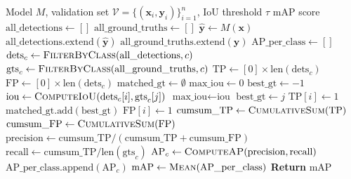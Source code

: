 \begin{algorithm}[H]
\caption{Mean Average Precision Computation}
\label{alg:map_computation}
\begin{algorithmic}[1]
\Require Model $M$, validation set $\mathcal{V} = \{(\mathbf{x}_i, \mathbf{y}_i)\}_{i=1}^{n}$, IoU threshold $\tau$
\Ensure mAP score
\State $\text{all\_detections} \gets []$
\State $\text{all\_ground\_truths} \gets []$
    \State $\hat{\mathbf{y}} \gets M(\mathbf{x})$ 
    \State $\text{all\_detections}.\text{extend}(\hat{\mathbf{y}})$
    \State $\text{all\_ground\_truths}.\text{extend}(\mathbf{y})$
\EndFor
\State $\text{AP\_per\_class} \gets []$
    \State $\text{dets}_c \gets \Call{FilterByClass}{\text{all\_detections}, c}$
    \State $\text{gts}_c \gets \Call{FilterByClass}{\text{all\_ground\_truths}, c}$
    \State {}
    \State $\text{TP} \gets [0] \times \text{len}(\text{dets}_c)$
    \State $\text{FP} \gets [0] \times \text{len}(\text{dets}_c)$
    \State $\text{matched\_gt} \gets \emptyset$
        \State $\text{max\_iou} \gets 0$
        \State $\text{best\_gt} \gets -1$
            \State $\text{iou} \gets \Call{ComputeIoU}{\text{dets}_c[i], \text{gts}_c[j]}$
                \State $\text{max\_iou} \gets \text{iou}$
                \State $\text{best\_gt} \gets j$
            \EndIf
        \EndFor
            \State $\text{TP}[i] \gets 1$
            \State $\text{matched\_gt}.\text{add}(\text{best\_gt})$
        \Else
            \State $\text{FP}[i] \gets 1$
        \EndIf
    \EndFor
    \State $\text{cumsum\_TP} \gets \Call{CumulativeSum}{\text{TP}}$
    \State $\text{cumsum\_FP} \gets \Call{CumulativeSum}{\text{FP}}$
    \State $\text{precision} \gets \text{cumsum\_TP} / (\text{cumsum\_TP} + \text{cumsum\_FP})$
    \State $\text{recall} \gets \text{cumsum\_TP} / \text{len}(\text{gts}_c)$
    \State $\text{AP}_c \gets \Call{ComputeAP}{\text{precision}, \text{recall}}$
    \State $\text{AP\_per\_class}.\text{append}(\text{AP}_c)$
\EndFor
\State $\text{mAP} \gets \Call{Mean}{\text{AP\_per\_class}}$
\State \textbf{Return} mAP
\end{algorithmic}
\end{algorithm}

